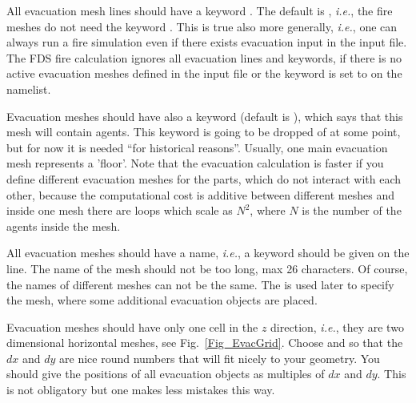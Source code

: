 \documentclass[12pt,a4paper,final,twoside]{stylevk}
\begin{document}
All evacuation mesh lines should have a keyword
.  The default is ,
\emph{i.e.}, the fire meshes do not need the keyword
.  This is true also more generally, \emph{i.e.},
one can always run a fire simulation even if there exists evacuation
input in the input file.  The FDS fire calculation ignores all
evacuation lines and keywords, if there is no active evacuation meshes
defined in the input file or the keyword  is set
to  on the  namelist.

Evacuation meshes should have also a keyword
 (default is ), which says
that this mesh will contain agents.  This keyword is going to be
dropped of at some point, but for now it is needed ``for historical
reasons''.  Usually, one main evacuation mesh represents a 'floor'.
Note that the evacuation calculation is faster if you define different
evacuation meshes for the parts, which do not interact with each
other, because the computational cost is additive between different
meshes and inside one mesh there are loops which scale as $N^2$, where
$N $ is the number of the agents inside the mesh.


All evacuation meshes should have a name, \emph{i.e.}, a keyword
 should be given on the  line.  The name of
the mesh should not be too long, max 26 characters.  Of course, the
names of different meshes can not be the same.  The  is used
later to specify the mesh, where some additional evacuation objects
are placed.


Evacuation meshes should have only one cell in the $z$ direction,
\emph{i.e.}, they are two dimensional horizontal meshes, see
Fig.~\ref{Fig_EvacGrid}.  Choose  and  so that
the $dx$ and $dy$ are nice round numbers that will fit nicely to your
geometry.  You should give the positions of all evacuation objects as
multiples of $dx$ and $dy$.  This is not obligatory but one makes less
mistakes this way.  
\end{document}
